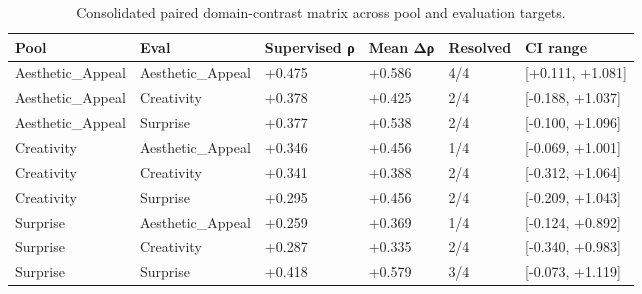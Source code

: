\begin{table}
\caption{Consolidated paired domain-contrast matrix across pool and evaluation targets.}
\label{tab:table_7_domain_contrast_target_pair_matrix}
\begin{tabular}{llllll}
\toprule
Pool & Eval & Supervised ρ & Mean Δρ & Resolved & CI range \\
\midrule
Aesthetic\_Appeal & Aesthetic\_Appeal & +0.475 & +0.586 & 4/4 & [+0.111, +1.081] \\
Aesthetic\_Appeal & Creativity & +0.378 & +0.425 & 2/4 & [-0.188, +1.037] \\
Aesthetic\_Appeal & Surprise & +0.377 & +0.538 & 2/4 & [-0.100, +1.096] \\
Creativity & Aesthetic\_Appeal & +0.346 & +0.456 & 1/4 & [-0.069, +1.001] \\
Creativity & Creativity & +0.341 & +0.388 & 2/4 & [-0.312, +1.064] \\
Creativity & Surprise & +0.295 & +0.456 & 2/4 & [-0.209, +1.043] \\
Surprise & Aesthetic\_Appeal & +0.259 & +0.369 & 1/4 & [-0.124, +0.892] \\
Surprise & Creativity & +0.287 & +0.335 & 2/4 & [-0.340, +0.983] \\
Surprise & Surprise & +0.418 & +0.579 & 3/4 & [-0.073, +1.119] \\
\bottomrule
\end{tabular}
\end{table}
